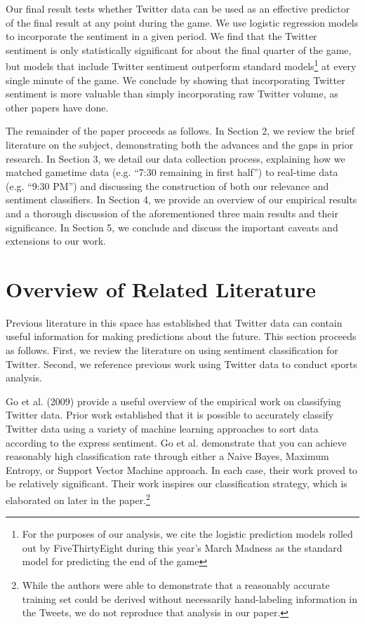 \documentclass[12pt]{article}
\begin{document}
\begin{doublespacing}
Our final result tests whether Twitter data can be used as an effective predictor of the final result at any point during the game. We use logistic regression models to incorporate the sentiment in a given period. We find that the Twitter sentiment is only statistically significant for about the final quarter of the game, but models that include Twitter sentiment outperform standard models\footnote{For the purposes of our analysis, we cite the logistic prediction models rolled out by FiveThirtyEight during this year's March Madness as the standard model for predicting the end of the game} at every single minute of the game. We conclude by showing that incorporating Twitter sentiment is more valuable than simply incorporating raw Twitter volume, as other papers have done. 

The remainder of the paper proceeds as follows. In Section 2, we review the brief literature on the subject, demonstrating both the advances and the gaps in prior research. In Section 3, we detail our data collection process, explaining how we matched gametime data (e.g. ``7:30 remaining in first half'') to real-time data (e.g. ``9:30 PM'') and discussing the construction of both our relevance and sentiment classifiers. In Section 4, we provide an overview of our empirical results and a thorough discussion of the aforementioned three main results and their significance. In Section 5, we conclude and discuss the important caveats and extensions to our work. 

\section{Overview of Related Literature}

Previous literature in this space has established that Twitter data can contain useful information for making predictions about the future. This section proceeds as follows. First, we review the literature on using sentiment classification for Twitter. Second, we reference previous work using Twitter data to conduct sports analysis.

Go et al. (2009) provide a useful overview of the empirical work on classifying Twitter data. Prior work established that it is possible to accurately classify Twitter data using a variety of machine learning approaches to sort data according to the express sentiment. Go et al. demonstrate that you can achieve reasonably high classification rate through either a Naive Bayes, Maximum Entropy, or Support Vector Machine approach. In each case, their work proved to be relatively significant. Their work inspires our classification strategy, which is elaborated on later in the paper.\footnote{While the authors were able to demonstrate that a reasonably accurate training set could be derived without necessarily hand-labeling information in the Tweets, we do not reproduce that analysis in our paper.}


\end{doublespacing}
\end{document}
